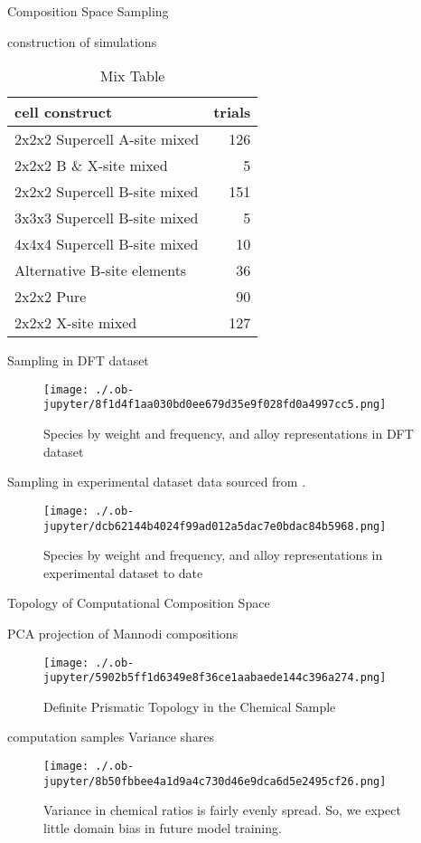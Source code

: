 \documentclass[9pt, compress]{beamer}
\begin{document}
\begin{frame}[allowframebreaks]{Composition Space Sampling}
\begin{block}{construction of simulations}
\begin{table}[htbp]
\caption{\label{tbl:mixing} Mix Table}
\centering
\begin{tabular}{lr}
cell construct & trials\\
\hline
2x2x2 Supercell A-site mixed & 126\\
2x2x2 B \& X-site mixed & 5\\
2x2x2 Supercell B-site mixed & 151\\
3x3x3 Supercell B-site mixed & 5\\
4x4x4 Supercell B-site mixed & 10\\
Alternative B-site elements & 36\\
2x2x2 Pure & 90\\
2x2x2 X-site mixed & 127\\
\end{tabular}
\end{table}
\end{block}
\begin{block}{Sampling in DFT dataset}
\begin{figure}[htbp]
\centering
\texttt{[image: ./.ob-jupyter/8f1d4f1aa030bd0ee679d35e9f028fd0a4997cc5.png]}
\caption{\label{fig:dft_rep} Species by weight and frequency, and alloy representations in DFT dataset}
\end{figure}
\end{block}
\begin{block}{Sampling in experimental dataset}
data sourced from \cite{almora-2020-devic-perfor}.
\begin{figure}[htbp]
\centering
\texttt{[image: ./.ob-jupyter/dcb62144b4024f99ad012a5dac7e0bdac84b5968.png]}
\caption{\label{fig:exp_rep} Species by weight and frequency, and alloy representations in experimental dataset to date}
\end{figure}
\end{block}
\end{frame}
\begin{frame}[allowframebreaks]{Topology of Computational Composition Space}
\begin{block}{PCA projection of Mannodi compositions}
\begin{figure}[htbp]
\centering
\texttt{[image: ./.ob-jupyter/5902b5ff1d6349e8f36ce1aabaede144c396a274.png]}
\caption{Definite Prismatic Topology in the Chemical Sample}
\end{figure}
\end{block}
\begin{block}{computation samples Variance shares}
\begin{figure}[htbp]
\centering
\texttt{[image: ./.ob-jupyter/8b50fbbee4a1d9a4c730d46e9dca6d5e2495cf26.png]}
\caption{Variance in chemical ratios is fairly evenly spread. So, we expect little domain bias in future model training.}
\end{figure}
\end{block}
\end{frame}
\end{document}
